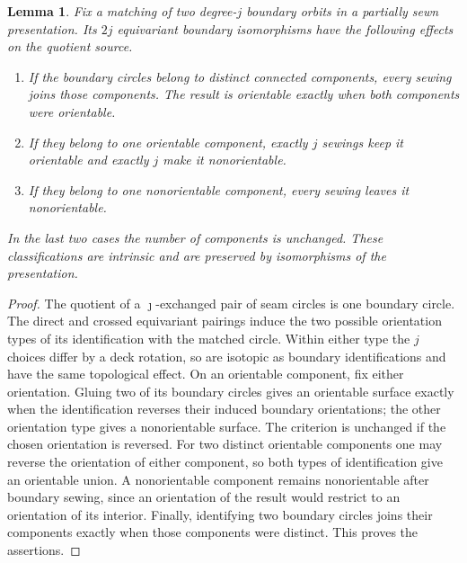 \documentclass[11pt,a4paper,reqno]{article}
\newtheorem{lemma}[theorem]{Lemma}
\theoremstyle{definition}
\theoremstyle{remark}
\begin{document}
\begin{lemma}\label{lem:boundary-sewing-topology}
Fix a matching of two degree-$j$ boundary orbits in a partially sewn presentation.  Its $2j$ equivariant boundary isomorphisms have the following effects on the quotient source.
\begin{enumerate}[label=\textup{(\roman*)}]
\item If the boundary circles belong to distinct connected components, every sewing joins those components.  The result is orientable exactly when both components were orientable.
\item If they belong to one orientable component, exactly $j$ sewings keep it orientable and exactly $j$ make it nonorientable.
\item If they belong to one nonorientable component, every sewing leaves it nonorientable.
\end{enumerate}
In the last two cases the number of components is unchanged.  These classifications are intrinsic and are preserved by isomorphisms of the presentation.
\end{lemma}

\begin{proof}
The quotient of a $\jmath$-exchanged pair of seam circles is one boundary circle.  The direct and crossed equivariant pairings induce the two possible orientation types of its identification with the matched circle.  Within either type the $j$ choices differ by a deck rotation, so are isotopic as boundary identifications and have the same topological effect.  On an orientable component, fix either orientation.  Gluing two of its boundary circles gives an orientable surface exactly when the identification reverses their induced boundary orientations; the other orientation type gives a nonorientable surface.  The criterion is unchanged if the chosen orientation is reversed.  For two distinct orientable components one may reverse the orientation of either component, so both types of identification give an orientable union.  A nonorientable component remains nonorientable after boundary sewing, since an orientation of the result would restrict to an orientation of its interior.  Finally, identifying two boundary circles joins their components exactly when those components were distinct.  This proves the assertions.
\end{proof}
\end{document}
